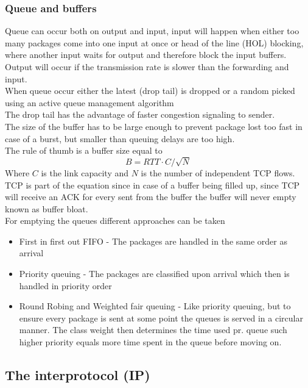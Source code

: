 \documentclass[12pt, a4paper]{article}
\begin{document}
			\subsubsection{Queue and buffers}
				Queue can occur both on output and input, input will happen when either too many packages come into one input at once or head of the line (HOL) blocking, where another input waits for output and therefore block the input buffers.\\
				Output will occur if the transmission rate is slower than the forwarding and input.\\
				When queue occur either the latest (drop tail) is dropped or a random picked using an active queue management algorithm\\
				The drop tail has the advantage of faster congestion signaling to sender.\\
				The size of the buffer has to be large enough to prevent package lost too fast in case of a burst, but smaller than queuing delays are too high.\\
				The rule of thumb is a buffer size equal to 
				$$B=RTT\cdot C/\sqrt{N}$$
				Where $C$ is the link capacity and $N$ is the number of independent TCP flows.\\
				TCP is part of the equation since in case of a buffer being filled up, since TCP will receive an ACK for every sent from the buffer the buffer will never empty known as buffer bloat.\\
				For emptying the queues different approaches can be taken
				\begin{itemize}
					\item First in first out FIFO - The packages are handled in the same order as arrival
					\item Priority queuing - The packages are classified upon arrival which then is handled in priority order
					\item Round Robing and Weighted fair queuing - Like priority queuing, but to ensure every package is sent at some point the queues is served in a circular manner. The class weight then determines the time used pr. queue such higher priority equals more time spent in the queue before moving on.
				\end{itemize}
		\subsection{The interprotocol (IP)}
\end{document}
